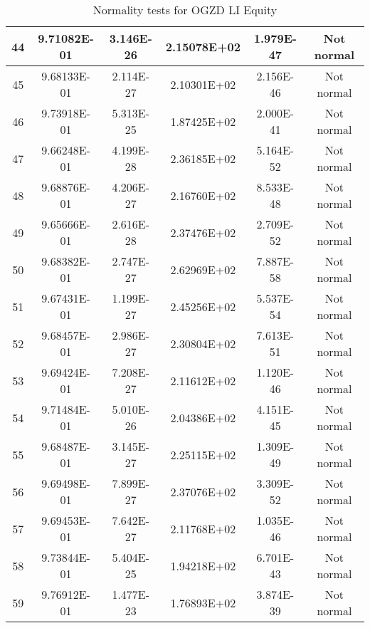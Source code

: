 \begin{table}[h]
\begin{tabular}{|c|c|c|c|c|c|}
		44 & 9.71082E-01 & 3.146E-26 & 2.15078E+02 & 1.979E-47 & Not normal\\\hline
		45 & 9.68133E-01 & 2.114E-27 & 2.10301E+02 & 2.156E-46 & Not normal\\\hline
		46 & 9.73918E-01 & 5.313E-25 & 1.87425E+02 & 2.000E-41 & Not normal\\\hline
		47 & 9.66248E-01 & 4.199E-28 & 2.36185E+02 & 5.164E-52 & Not normal\\\hline
		48 & 9.68876E-01 & 4.206E-27 & 2.16760E+02 & 8.533E-48 & Not normal\\\hline
		49 & 9.65666E-01 & 2.616E-28 & 2.37476E+02 & 2.709E-52 & Not normal\\\hline
		50 & 9.68382E-01 & 2.747E-27 & 2.62969E+02 & 7.887E-58 & Not normal\\\hline
		51 & 9.67431E-01 & 1.199E-27 & 2.45256E+02 & 5.537E-54 & Not normal\\\hline
		52 & 9.68457E-01 & 2.986E-27 & 2.30804E+02 & 7.613E-51 & Not normal\\\hline
		53 & 9.69424E-01 & 7.208E-27 & 2.11612E+02 & 1.120E-46 & Not normal\\\hline
		54 & 9.71484E-01 & 5.010E-26 & 2.04386E+02 & 4.151E-45 & Not normal\\\hline
		55 & 9.68487E-01 & 3.145E-27 & 2.25115E+02 & 1.309E-49 & Not normal\\\hline
		56 & 9.69498E-01 & 7.899E-27 & 2.37076E+02 & 3.309E-52 & Not normal\\\hline
		57 & 9.69453E-01 & 7.642E-27 & 2.11768E+02 & 1.035E-46 & Not normal\\\hline
		58 & 9.73844E-01 & 5.404E-25 & 1.94218E+02 & 6.701E-43 & Not normal\\\hline
		59 & 9.76912E-01 & 1.477E-23 & 1.76893E+02 & 3.874E-39 & Not normal\\\hline
	\end{tabular}
	\caption{Normality tests for OGZD LI Equity}
	\label{tab:normality_tests_OGZD_LI}
\end{table}
